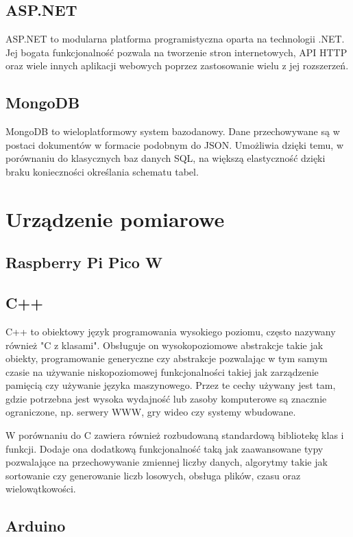 \subsection*{ASP.NET}
ASP.NET to modularna platforma programistyczna oparta na technologii .NET. 
Jej bogata funkcjonalność pozwala na tworzenie stron internetowych, API HTTP oraz 
wiele innych aplikacji webowych poprzez zastosowanie wielu z jej rozszerzeń.

\subsection*{MongoDB}
MongoDB to wieloplatformowy system bazodanowy. Dane przechowywane są w postaci dokumentów
w formacie podobnym do JSON. Umożliwia dzięki temu, w porównaniu do klasycznych baz
danych SQL, na większą elastyczność dzięki braku konieczności określania schematu tabel.

\section{Urządzenie pomiarowe}

\subsection*{Raspberry Pi Pico W}

\subsection*{C++}
C++ to obiektowy język programowania wysokiego poziomu, często nazywany również "C z klasami".
Obsługuje on wysokopoziomowe abstrakcje takie jak obiekty, programowanie generyczne czy
abstrakcje pozwalając w tym samym czasie na używanie niskopoziomowej funkcjonalności 
takiej jak zarządzenie pamięcią czy używanie języka maszynowego. Przez te cechy
używany jest tam, gdzie potrzebna jest wysoka wydajność lub zasoby komputerowe
są znacznie ograniczone, np. serwery WWW, gry wideo czy systemy wbudowane.

W porównaniu do C zawiera również rozbudowaną standardową bibliotekę klas i funkcji.
Dodaje ona dodatkową funkcjonalność taką jak zaawansowane typy pozwalające na
przechowywanie zmiennej liczby danych, algorytmy takie jak sortowanie czy 
generowanie liczb losowych, obsługa plików, czasu oraz wielowątkowości.

\subsection*{Arduino}
